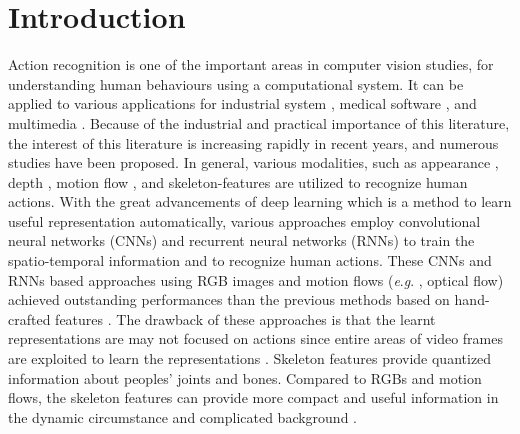 \documentclass[runningheads]{llncs}
\newcommand{\eg}{\textit{e}.\textit{g}. }
\begin{document}
\section{Introduction}
Action recognition is one of the important areas in computer vision studies, for understanding human behaviours using a computational system. It can be applied to various applications for industrial system \cite{tran20113,nozaki2012recognition}, medical software \cite{bahrepour2011sensor}, and multimedia \cite{zhang2012microsoft,wang2017two}. Because of the industrial and practical importance of this literature, the interest of this literature is increasing rapidly in recent years, and numerous studies have been proposed. In general, various modalities, such as appearance \cite{Feichtenhofer_2016_CVPR}, depth \cite{zhang2016rgb,liu2019learning}, motion flow \cite{wang2019hallucinating}, and skeleton-features \cite{si2019attention} are utilized to recognize human actions. With the great advancements of deep learning which is a method to learn useful representation automatically, various approaches employ convolutional neural networks (CNNs) \cite{kim2017interpretable,ding2017investigation,carreira2017quo} and recurrent neural networks (RNNs) \cite{liu2016spatio,zhang2018fusing,zhang2017view} to train the spatio-temporal information and to recognize human actions. These CNNs and RNNs based approaches using RGB images and motion flows (\eg, optical flow) achieved outstanding performances than the previous methods based on hand-crafted features \cite{wang2013action,xia2012view}. The drawback of these approaches is that the learnt representations are may not focused on actions since entire areas of video frames are exploited to learn the representations \cite{shi2019two,fernando2015modeling}. Skeleton features provide quantized information about peoples' joints and bones. Compared to RGBs and motion flows, the skeleton features can provide more compact and useful information in the dynamic circumstance and complicated background \cite{vemulapalli2014human,fernando2015modeling,du2015hierarchical,ke2017new}. 
\end{document}
